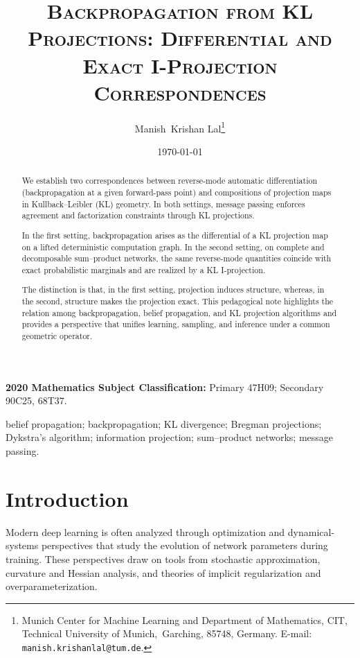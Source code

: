 \documentclass[12pt]{article}
\newcommand{\1}{\mathbb{1}}
\theoremstyle{definition}
\begin{document}
\title{\textsc{
Backpropagation from KL Projections: Differential and Exact I-Projection Correspondences
}}

\author{
Manish\ Krishan Lal\thanks{
                 Munich Center for Machine Learning and Department of Mathematics, CIT,	
Technical University of Munich,\ Garching, 85748, Germany.
                 E-mail: \texttt{manish.krishanlal@tum.de}.}
                 }

\date{\today} 
\maketitle

\begin{abstract} \noindent
We establish two correspondences between reverse-mode automatic
differentiation (backpropagation at a given forward-pass point) and
compositions of projection maps in Kullback--Leibler (KL) geometry.
In both settings, message passing enforces agreement and factorization
constraints through KL projections.

In the first setting, backpropagation arises as the differential of a KL
projection map on a lifted deterministic computation graph.
In the second setting, on complete and decomposable sum--product networks,
the same reverse-mode quantities coincide with exact probabilistic marginals
and are realized by a KL I-projection.

The distinction is that, in the first setting, projection induces structure,
whereas, in the second, structure makes the projection exact. This pedagogical note highlights the relation among backpropagation,
belief propagation, and KL projection algorithms and provides a perspective that unifies learning, sampling, and inference under a common
geometric operator.
\end{abstract}

{\bfseries 2020 Mathematics Subject Classification:}
Primary 47H09;
Secondary 90C25, 68T37.

belief propagation; backpropagation; KL divergence; Bregman projections;
Dykstra’s algorithm; information projection; sum--product networks; message passing.

\section{Introduction}
\label{sec:introduction}

Modern deep learning is often analyzed through optimization and
dynamical-systems perspectives that study the evolution of network
parameters during training. These perspectives draw on tools from
stochastic approximation, curvature and Hessian analysis, and theories
of implicit regularization and overparameterization.
\end{document}
